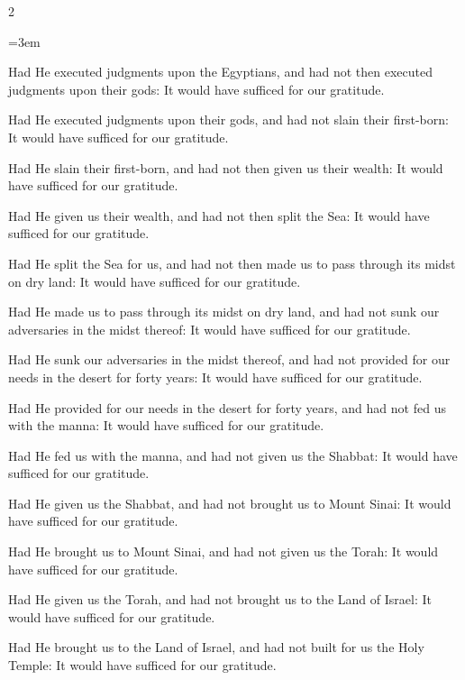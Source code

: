 \documentclass[11pt, openany]{book}
\newenvironment{bilingual}{%
  \par\vspace{4pt}%
  \begin{paracol}{2}%
}{%
  \end{paracol}%
  \par\vspace{2pt}%
}
\newenvironment{englishcol}{%
  \switchcolumn[0]%
  \begingroup
  \setstretch{1.4}%
  \emergencystretch=3em
  \tolerance=9999
  \normalsize
  \rightskip=0.12in\relax
}{%
  \endgroup
}
\begin{document}
\begin{bilingual}
\begin{englishcol}
Had He executed judgments upon the Egyptians, and had not then executed judgments upon their gods: It would have sufficed for our gratitude.

Had He executed judgments upon their gods, and had not slain their first-born: It would have sufficed for our gratitude.

Had He slain their first-born, and had not then given us their wealth: It would have sufficed for our gratitude.

Had He given us their wealth, and had not then split the Sea: It would have sufficed for our gratitude.

Had He split the Sea for us, and had not then made us to pass through its midst on dry land: It would have sufficed for our gratitude.

Had He made us to pass through its midst on dry land, and had not sunk our adversaries in the midst thereof: It would have sufficed for our gratitude.

Had He sunk our adversaries in the midst thereof, and had not provided for our needs in the desert for forty years: It would have sufficed for our gratitude.

Had He provided for our needs in the desert for forty years, and had not fed us with the manna: It would have sufficed for our gratitude.

Had He fed us with the manna, and had not given us the Shabbat: It would have sufficed for our gratitude.

Had He given us the Shabbat, and had not brought us to Mount Sinai: It would have sufficed for our gratitude.

Had He brought us to Mount Sinai, and had not given us the Torah: It would have sufficed for our gratitude.

Had He given us the Torah, and had not brought us to the Land of Israel: It would have sufficed for our gratitude.

Had He brought us to the Land of Israel, and had not built for us the Holy Temple: It would have sufficed for our gratitude.
\end{englishcol}
\end{bilingual}
\end{document}
